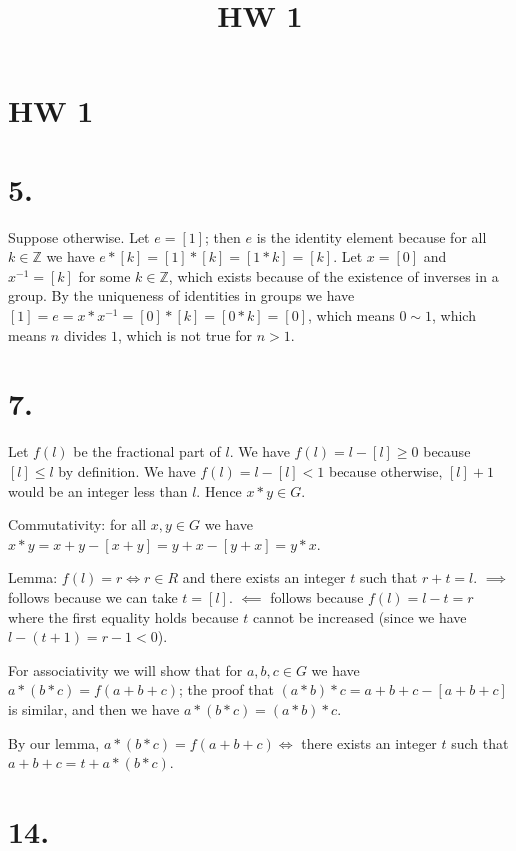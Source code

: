 \documentclass{article}
\title{HW 1}
\date{}
\def\Z{\mathbb{Z}}
\begin{document}
\maketitle

\section*{HW 1}

\section*{5.}

Suppose otherwise. Let $e = [1]$; then $e$ is the identity element because for all $k \in \Z$ we have $e*[k] = [1]*[k] = [1*k] = [k]$. Let $x=[0]$ and $x^{-1}=[k]$ for some $k \in \Z$, which exists because of the existence of inverses in a group. By the uniqueness of identities in groups we have $[1] = e = x*x^{-1} = [0]*[k] = [0*k] = [0]$, which means $0 \sim 1$, which means $n$ divides $1$, which is not true for $n>1$.

\section*{7.}

Let $f(l)$ be the fractional part of $l$. We have $f(l) = l - [l] \ge 0$ because $[l] \le l$ by definition. We have $f(l) = l - [l] < 1$ because otherwise, $[l]+1$ would be an integer less than $l$. Hence $x * y \in G$.
 
Commutativity: for all $x, y \in G$ we have $x*y = x + y - [x+y] = y+x - [y+x] = y*x$. 

Lemma: $f(l) = r \iff r \in R$ and there exists an integer $t$ such that $r + t = l$. $\implies$ follows because we can take $t = [l]$. $\impliedby$ follows because $f(l) = l-t = r$ where the first equality holds because $t$ cannot be increased (since we have $l - (t+1) = r-1 < 0$).

For associativity we will show that for $a, b, c \in G$ we have $a*(b*c) = f(a + b + c)$; the proof that $(a*b)*c = a + b + c - [a+b+c]$ is similar, and then we have $a*(b*c) = (a*b)*c$.

By our lemma, $a*(b*c) = f(a + b + c) \iff$ there exists an integer $t$ such that $a + b + c = t + a*(b*c)$.

\section*{14.}
\end{document}
